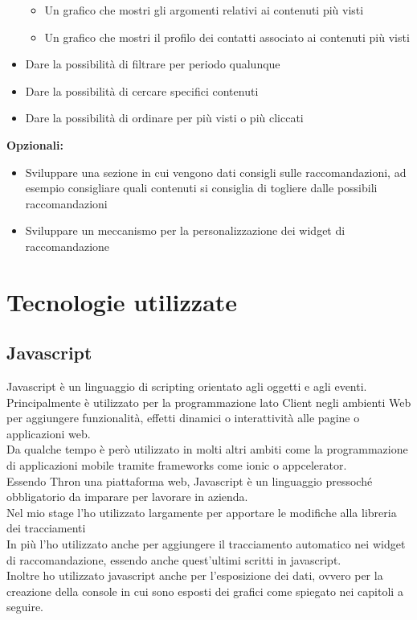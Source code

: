 \documentclass[a4paper, 12pt, twoside, openright]{book}
\begin{document}
\begin{itemize}
\begin{itemize}
		\item Un grafico che mostri gli argomenti relativi ai contenuti più visti
		\item Un grafico che mostri il profilo dei contatti associato ai contenuti più visti
		
	\end{itemize}

	\item Dare la possibilità di filtrare per periodo qualunque
	\item Dare la possibilità di cercare specifici contenuti
	\item Dare la possibilità di ordinare per più visti o più cliccati
\end{itemize}
\textbf{Opzionali:}
\begin{itemize}
	\item Sviluppare una sezione in cui vengono dati consigli sulle raccomandazioni, ad esempio consigliare quali contenuti si consiglia di togliere dalle possibili raccomandazioni
	\item Sviluppare un meccanismo per la personalizzazione dei widget di raccomandazione
\end{itemize}

\newpage{}
\section{Tecnologie utilizzate}

\subsection{Javascript}
Javascript è un linguaggio di scripting orientato agli oggetti e agli eventi. Principalmente è utilizzato per la programmazione lato Client negli ambienti Web per aggiungere funzionalità, effetti dinamici o interattività alle pagine o applicazioni web.\\
Da qualche tempo è però utilizzato in molti altri ambiti come la programmazione di applicazioni mobile tramite frameworks come ionic o appcelerator.\\
Essendo Thron una piattaforma web, Javascript è un linguaggio pressoché obbligatorio da imparare per lavorare in azienda.\\
Nel mio stage l'ho utilizzato largamente per apportare le modifiche alla libreria dei tracciamenti\\ 
In più l'ho utilizzato anche per aggiungere il tracciamento automatico nei widget di raccomandazione, essendo anche quest'ultimi scritti in javascript.\\
Inoltre ho utilizzato javascript anche per l'esposizione dei dati, ovvero per la creazione della console in cui sono esposti dei grafici come spiegato nei capitoli a seguire.\\ \\
\end{document}

